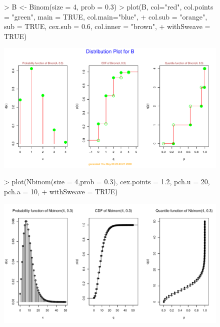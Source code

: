 \documentclass[11pt]{article}
\begin{document}
\begin{figure}[p]
\begin{Schunk}
\begin{Sinput}
> B <- Binom(size = 4, prob = 0.3)
> plot(B, col="red", col.points = "green", main = TRUE, col.main="blue",
+      col.sub = "orange", sub = TRUE, cex.sub = 0.6, col.inner = "brown",
+      withSweave = TRUE)
\end{Sinput}
\end{Schunk}
\includegraphics{distr-plotex5}
\end{figure}

\begin{figure}[p]
\begin{Schunk}
\begin{Sinput}
> plot(Nbinom(size = 4,prob = 0.3), cex.points = 1.2, pch.u = 20, pch.a = 10,
+      withSweave = TRUE)
\end{Sinput}
\end{Schunk}
\includegraphics{distr-plotex6}
\end{figure}
\end{document}
